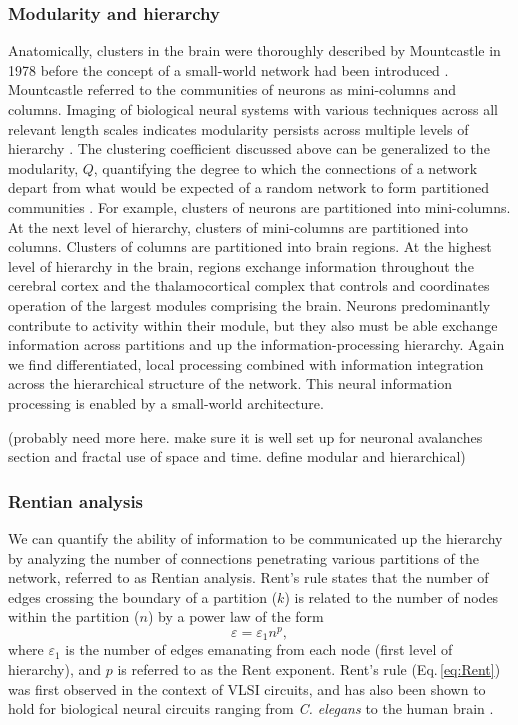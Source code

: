 \documentclass[twocolumn]{article}
\begin{document}
\subsubsection{\label{sec:modularity_and_hierarchy}Modularity and hierarchy}
Anatomically, clusters in the brain were thoroughly described by Mountcastle in 1978 \cite{mo1978} before the concept of a small-world network had been introduced \cite{wast1998}. Mountcastle referred to the communities of neurons as mini-columns and columns. Imaging of biological neural systems with various techniques across all relevant length scales indicates modularity persists across multiple levels of hierarchy \cite{beba2017}. The clustering coefficient discussed above can be generalized to the modularity, $Q$, quantifying the degree to which the connections of a network depart from what would be expected of a random network to form partitioned communities \cite{rusp2010,beba2017}. For example, clusters of neurons are partitioned into mini-columns. At the next level of hierarchy, clusters of mini-columns are partitioned into columns. Clusters of columns are partitioned into brain regions. At the highest level of hierarchy in the brain, regions exchange information throughout the cerebral cortex and the thalamocortical complex that controls and coordinates operation of the largest modules comprising the brain. Neurons predominantly contribute to activity within their module, but they also must be able exchange information across partitions and up the information-processing hierarchy. Again we find differentiated, local processing combined with information integration across the hierarchical structure of the network. This neural information processing is enabled by a small-world architecture.

(probably need more here. make sure it is well set up for neuronal avalanches section and fractal use of space and time. define modular and hierarchical)

\subsubsection{Rentian analysis}
We can quantify the ability of information to be communicated up the hierarchy by analyzing the number of connections penetrating various partitions of the network, referred to as Rentian analysis. Rent's rule states that the number of edges crossing the boundary of a partition ($k$) is related to the number of nodes within the partition ($n$) by a power law of the form
\begin{equation}
\label{eq:Rent}
\varepsilon = \varepsilon_1 n^p,
\end{equation}
where $\varepsilon_1$ is the number of edges emanating from each node (first level of hierarchy), and $p$ is referred to as the Rent exponent. Rent's rule (Eq.\,\ref{eq:Rent}) was first observed in the context of VLSI circuits, and has also been shown to hold for biological neural circuits ranging from \textit{C. elegans} to the human brain \cite{bagr2010}. 
\end{document}
